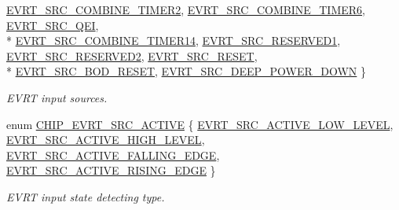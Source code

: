 \begin{DoxyCompactItemize}
\hyperlink{group___e_v_r_t__18_x_x__43_x_x_ggad3cd727405aa5446c2319375ad1b7276a3d09c16edc5aaf931067d5a95e0d12d4}{E\+V\+R\+T\+\_\+\+S\+R\+C\+\_\+\+C\+O\+M\+B\+I\+N\+E\+\_\+\+T\+I\+M\+E\+R2}, 
\hyperlink{group___e_v_r_t__18_x_x__43_x_x_ggad3cd727405aa5446c2319375ad1b7276ac2cde7d22824282b0b4664c91851bd51}{E\+V\+R\+T\+\_\+\+S\+R\+C\+\_\+\+C\+O\+M\+B\+I\+N\+E\+\_\+\+T\+I\+M\+E\+R6}, 
\hyperlink{group___e_v_r_t__18_x_x__43_x_x_ggad3cd727405aa5446c2319375ad1b7276ad7837b1baab7cf963d41152f18ca7caf}{E\+V\+R\+T\+\_\+\+S\+R\+C\+\_\+\+Q\+EI}, 
\\*
\hyperlink{group___e_v_r_t__18_x_x__43_x_x_ggad3cd727405aa5446c2319375ad1b7276ab221b6dd3f6c3ffaa7be09851bc6a96e}{E\+V\+R\+T\+\_\+\+S\+R\+C\+\_\+\+C\+O\+M\+B\+I\+N\+E\+\_\+\+T\+I\+M\+E\+R14}, 
\hyperlink{group___e_v_r_t__18_x_x__43_x_x_ggad3cd727405aa5446c2319375ad1b7276ae1eee006e0e51c5867c22cded241bab8}{E\+V\+R\+T\+\_\+\+S\+R\+C\+\_\+\+R\+E\+S\+E\+R\+V\+E\+D1}, 
\hyperlink{group___e_v_r_t__18_x_x__43_x_x_ggad3cd727405aa5446c2319375ad1b7276a887386904af16b2610c0e77eb23c4f4c}{E\+V\+R\+T\+\_\+\+S\+R\+C\+\_\+\+R\+E\+S\+E\+R\+V\+E\+D2}, 
\hyperlink{group___e_v_r_t__18_x_x__43_x_x_ggad3cd727405aa5446c2319375ad1b7276a8980bc0e34c2d2cd0097a1db5f5ca938}{E\+V\+R\+T\+\_\+\+S\+R\+C\+\_\+\+R\+E\+S\+ET}, 
\\*
\hyperlink{group___e_v_r_t__18_x_x__43_x_x_ggad3cd727405aa5446c2319375ad1b7276a86e06696aafff8c1d80b78522ccc1781}{E\+V\+R\+T\+\_\+\+S\+R\+C\+\_\+\+B\+O\+D\+\_\+\+R\+E\+S\+ET}, 
\hyperlink{group___e_v_r_t__18_x_x__43_x_x_ggad3cd727405aa5446c2319375ad1b7276ad5457c1d7b5940a8862e3bd12b90c8bb}{E\+V\+R\+T\+\_\+\+S\+R\+C\+\_\+\+D\+E\+E\+P\+\_\+\+P\+O\+W\+E\+R\+\_\+\+D\+O\+WN}
 \}\begin{DoxyCompactList}\small\item\em E\+V\+RT input sources. \end{DoxyCompactList}
\item 
enum \hyperlink{group___e_v_r_t__18_x_x__43_x_x_ga721fc5bcb9c562312b880ba4cd5b96a6}{C\+H\+I\+P\+\_\+\+E\+V\+R\+T\+\_\+\+S\+R\+C\+\_\+\+A\+C\+T\+I\+VE} \{ \hyperlink{group___e_v_r_t__18_x_x__43_x_x_gga721fc5bcb9c562312b880ba4cd5b96a6a8e3a18193d78a0bf6f15f48e9acbd63f}{E\+V\+R\+T\+\_\+\+S\+R\+C\+\_\+\+A\+C\+T\+I\+V\+E\+\_\+\+L\+O\+W\+\_\+\+L\+E\+V\+EL}, 
\hyperlink{group___e_v_r_t__18_x_x__43_x_x_gga721fc5bcb9c562312b880ba4cd5b96a6af7f90ce420d1b32c2e46e6e4ee175860}{E\+V\+R\+T\+\_\+\+S\+R\+C\+\_\+\+A\+C\+T\+I\+V\+E\+\_\+\+H\+I\+G\+H\+\_\+\+L\+E\+V\+EL}, 
\hyperlink{group___e_v_r_t__18_x_x__43_x_x_gga721fc5bcb9c562312b880ba4cd5b96a6aa4bea1e2dc8bdabd93ca8f070a57a506}{E\+V\+R\+T\+\_\+\+S\+R\+C\+\_\+\+A\+C\+T\+I\+V\+E\+\_\+\+F\+A\+L\+L\+I\+N\+G\+\_\+\+E\+D\+GE}, 
\hyperlink{group___e_v_r_t__18_x_x__43_x_x_gga721fc5bcb9c562312b880ba4cd5b96a6abe05f14607f49a7e163ab870ea32d0d9}{E\+V\+R\+T\+\_\+\+S\+R\+C\+\_\+\+A\+C\+T\+I\+V\+E\+\_\+\+R\+I\+S\+I\+N\+G\+\_\+\+E\+D\+GE}
 \}\begin{DoxyCompactList}\small\item\em E\+V\+RT input state detecting type. \end{DoxyCompactList}
\end{DoxyCompactItemize}
